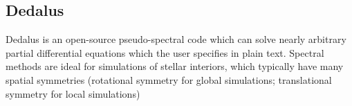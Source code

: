 {\color{purple}    
\subsection{Dedalus}}

Dedalus is an open-source pseudo-spectral code which can solve nearly arbitrary partial differential equations which the user specifies in plain text. Spectral methods are ideal for simulations of stellar interiors, which typically have many spatial symmetries (rotational symmetry for global simulations; translational symmetry for local simulations) 
